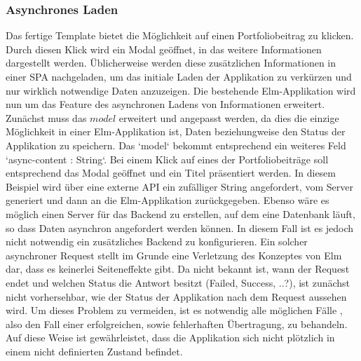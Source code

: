 \subsubsection{Asynchrones Laden}
\label{sec:Asynchrones Laden - Analyse}
Das fertige Template bietet die Möglichkeit auf einen Portfoliobeitrag zu klicken. Durch diesen Klick wird ein Modal geöffnet, in das weitere Informationen dargestellt werden. Üblicherweise werden diese zusätzlichen Informationen in einer \ac{SPA} nachgeladen, um das initiale Laden der Applikation zu verkürzen und nur wirklich notwendige Daten anzuzeigen. Die bestehende Elm-Applikation wird nun um das Feature des asynchronen Ladens von Informationen erweitert.
Zunächst muss das $model$ erweitert und angepasst werden, da dies die einzige Möglichkeit in einer Elm-Applikation ist, Daten beziehungweise den Status der Applikation zu speichern. Das `model` bekommt entsprechend ein weiteres Feld `async-content : String`.
Bei einem Klick auf eines der Portfoliobeiträge soll entsprechend das Modal geöffnet und ein Titel präsentiert werden. In diesem Beispiel wird über eine externe API ein zufälliger String angefordert, vom Server generiert und dann an die Elm-Applikation zurückgegeben. Ebenso wäre es möglich einen Server für das Backend zu erstellen, auf dem eine Datenbank läuft, so dass Daten asynchron angefordert werden können. In diesem Fall ist es jedoch nicht notwendig ein zusätzliches Backend zu konfigurieren.
Ein solcher asynchroner Request stellt im Grunde eine Verletzung des Konzeptes von Elm dar, dass es keinerlei Seiteneffekte gibt. Da nicht bekannt ist, wann der Request endet und welchen Status die Antwort besitzt (Failed, Success, ..?), ist zunächst nicht vorhersehbar, wie der Status der Applikation nach dem Request aussehen wird. Um dieses Problem zu vermeiden, ist es notwendig alle möglichen Fälle , also den Fall einer erfolgreichen, sowie fehlerhaften Übertragung, zu behandeln. Auf diese Weise ist gewährleistet, dass die Applikation sich nicht plötzlich in einem nicht definierten Zustand befindet.
